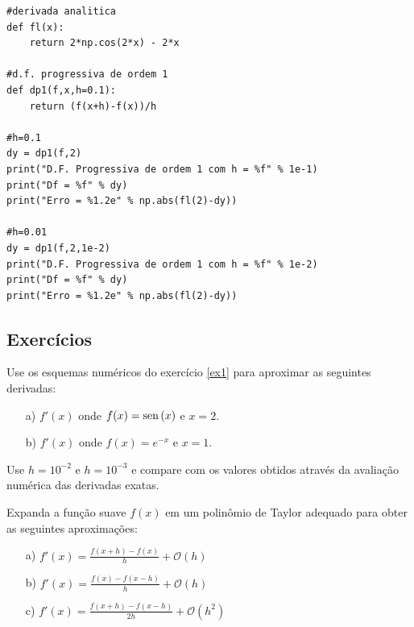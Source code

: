 \begin{resol}
\begin{verbatim}
#derivada analitica
def fl(x):
    return 2*np.cos(2*x) - 2*x

#d.f. progressiva de ordem 1
def dp1(f,x,h=0.1):
    return (f(x+h)-f(x))/h

#h=0.1
dy = dp1(f,2)
print("D.F. Progressiva de ordem 1 com h = %f" % 1e-1)
print("Df = %f" % dy)
print("Erro = %1.2e" % np.abs(fl(2)-dy))

#h=0.01
dy = dp1(f,2,1e-2)
print("D.F. Progressiva de ordem 1 com h = %f" % 1e-2)
print("Df = %f" % dy)
print("Erro = %1.2e" % np.abs(fl(2)-dy))
\end{verbatim}
\fi
\end{resol}


\subsection*{Exercícios}

\begin{exer}
Use os esquemas numéricos do exercício \ref{ex1} para aproximar as seguintes derivadas:
\begin{itemize}
\item[a)] $f'(x)$ onde $f(x)=\operatorname{sen}\,(x)$ e $x=2$.
\item[b)] $f'(x)$ onde $f(x)=e^{-x}$ e $x=1$.
\end{itemize}
Use $h=10^{-2}$ e $h=10^{-3}$ e compare com os valores obtidos através da avaliação numérica das derivadas exatas.
\end{exer}

\begin{exer}\label{ex1} Expanda a função suave $f(x)$ em um polinômio de Taylor adequado para obter as seguintes aproximações:
\begin{itemize}
\item[a)] $f'(x)=\frac{f(x+h)-f(x)}{h}+\mathcal{O}(h)$
\item[b)] $f'(x)=\frac{f(x)-f(x-h)}{h}+\mathcal{O}(h)$
\item[c)] $f'(x)=\frac{f(x+h)-f(x-h)}{2h}+\mathcal{O}(h^2)$
\end{itemize}
\end{exer}



